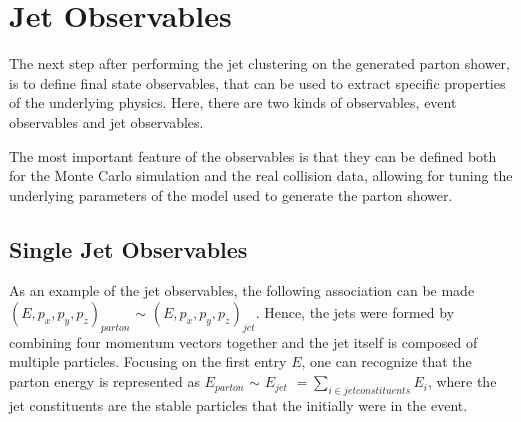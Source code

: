\chapter{Jet Observables}

The next step after performing the jet clustering on the generated parton shower, is to define final state observables, that can be used to extract specific properties of the underlying physics. Here, there are two kinds of observables, event observables and jet observables.  

The most important feature of the observables is that they can be defined both for the Monte Carlo simulation and the real collision data, allowing for tuning the underlying parameters of the model used to generate the parton shower. 
\section{Single Jet Observables}


As an example of the jet observables, the following association can be made $(E, p_x, p_y, p_z)_{parton}$ $\sim$ $(E, p_x, p_y, p_z)_{jet}$. Hence, the jets were formed by combining four momentum vectors together and the jet itself is composed of multiple particles. Focusing on the first entry $E$, one can recognize that the parton energy is represented as $E_{parton}$ $\sim$ $E_{jet}$  $= \sum_{i \in jet constituents} E_{i}$, where the jet constituents are the stable particles that the initially were in the event. 

